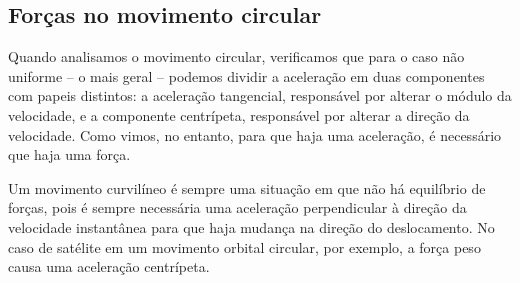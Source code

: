 \subsection{Forças no movimento circular}
   
Quando analisamos o movimento circular, verificamos que para o caso não uniforme -- o mais geral -- podemos dividir a aceleração em duas componentes com papeis distintos: a aceleração tangencial, responsável por alterar o módulo da velocidade, e a componente centrípeta, responsável por alterar a direção da velocidade. Como vimos, no entanto, para que haja uma aceleração, é necessário que haja uma força. 

\begin{marginfigure}
\centering
{}
\caption{Um movimento curvilíneo é sempre uma situação em que não há equilíbrio de forças, pois é sempre necessária uma aceleração perpendicular à direção da velocidade instantânea para que haja mudança na direção do deslocamento. No caso de satélite em um movimento orbital circular, por exemplo, a força peso causa uma aceleração centrípeta.}
\end{marginfigure}

